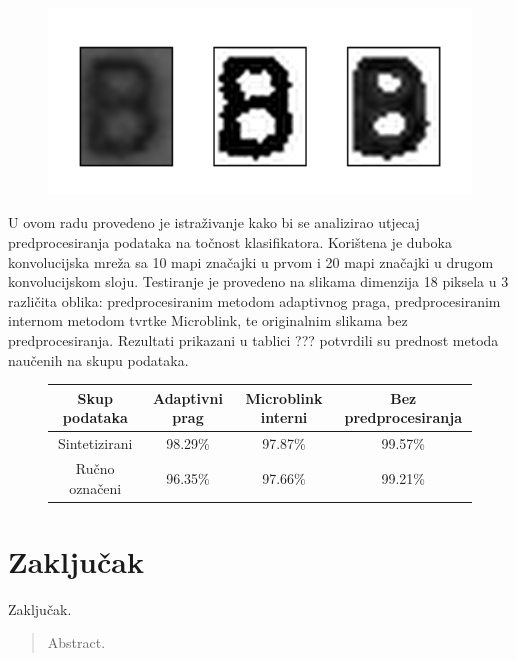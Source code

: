 \documentclass[lmodern, utf8, diplomski, numeric]{fer}
\begin{document}
\begin{figure}[ht!]
\centering
\includegraphics[width=13cm]{slike/preprocessing_comparison.png}
\caption{}
\end{figure}

U ovom radu provedeno je istraživanje kako bi se analizirao utjecaj predprocesiranja podataka na točnost klasifikatora. Korištena je duboka konvolucijska mreža sa 10 mapi značajki u prvom i 20 mapi značajki u drugom konvolucijskom sloju. Testiranje je provedeno na slikama dimenzija 18 piksela u 3 različita oblika: predprocesiranim metodom adaptivnog praga, predprocesiranim internom metodom tvrtke Microblink, te originalnim slikama bez predprocesiranja. Rezultati prikazani u tablici ??? potvrdili su prednost metoda naučenih na skupu podataka.    


\begin{figure}[ht!]
\begin{center}
\centering


    \begin{tabular}{ | c| c| c|c |}
    \hline
    Skup podataka & Adaptivni prag & Microblink interni & Bez predprocesiranja \\ \hline
    Sintetizirani & 98.29\% & 97.87\%  & 99.57\% \\ \hline
    Ručno označeni & 96.35\% & 97.66\% & 99.21\% \\ \hline

    \hline
    \end{tabular}
\end{center}
\caption{}
\end{figure}



\chapter{Zaključak}
Zaključak.




\begin{sazetak}


\end{sazetak}

\begin{abstract}
Abstract.

\end{abstract}
\end{document}
